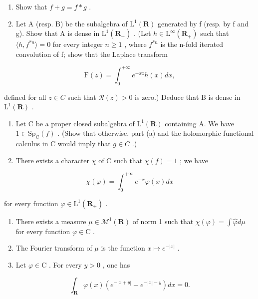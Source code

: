 \begin{enumerate}
\def\labelenumi{\alph{enumi})}
\item
  Show that \(f + g = f * g\) .
\item
  Let A (resp. B) be the subalgebra of \(\mathrm{L}^{1}(\mathbf{R})\) generated by f (resp. by f and g). Show that A is dense in \(\mathrm{L}^{1}(\mathbf{R}_{+})\) . (Let \(h \in \mathrm{L}^{\infty}(\mathbf{R}_{+})\) such that \(\langle h, f^{*n} \rangle = 0\) for every integer \(n \geqslant 1\) , where \(f^{*n}\) is the n-fold iterated convolution of f; show that the Laplace transform
\end{enumerate}

\[
\mathrm{F} (z) = \int_ {0} ^ {+ \infty} e ^ {- x z} h (x) d x,
\]

defined for all \(z \in C\) such that \(\mathcal{R}(z) > 0\) is zero.) Deduce that B is dense in \(\mathrm{L}^{1}(\mathbf{R})\) .

\begin{enumerate}
\def\labelenumi{\alph{enumi})}
\setcounter{enumi}{2}
\item
  Let C be a proper closed subalgebra of \(\mathrm{L}^{1}(\mathbf{R})\) containing A. We have \(1 \in \mathrm{Sp}_{\mathrm{C}}(f)\) . (Show that otherwise, part (a) and the holomorphic functional calculus in C would imply that \(g \in C\) .)
\item
  There exists a character \(\chi\) of C such that \(\chi(f)=1\) ; we have
\end{enumerate}

\[
\chi (\varphi) = \int_ {0} ^ {+ \infty} e ^ {- x} \varphi (x) d x
\]

for every function \(\varphi\in\mathrm{L}^{1}(\mathbf{R}_{+})\) .

\begin{enumerate}
\def\labelenumi{\alph{enumi})}
\setcounter{enumi}{4}
\item
  There exists a measure \(\mu \in \mathcal{M}^1 (\mathbf{R})\) of norm 1 such that \(\chi (\varphi) = \int \widehat{\varphi} d\mu\) for every function \(\varphi \in \mathrm{C}\) .
\item
  The Fourier transform of \(\mu\) is the function \(x \mapsto e^{-|x|}\) .
\item
  Let \(\varphi \in \mathrm{C}\) . For every \(y > 0\) , one has
\end{enumerate}

\[
\int_ {\mathbf {R}} \varphi (x) (e ^ {- | x + y |} - e ^ {- | x | - y}) d x = 0.
\]


